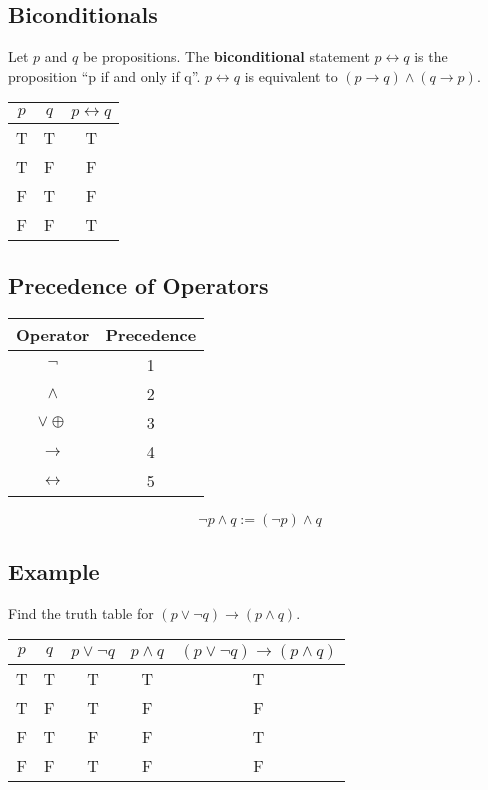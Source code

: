 \documentclass{math}
\begin{document}
\subsection*{Biconditionals}
Let \( p \) and \( q \) be propositions. The \textbf{biconditional} statement
\( p \leftrightarrow q \) is the proposition ``p if and only if q''.
\( p \leftrightarrow q \) is equivalent to \( (p \to q) \wedge (q \to p) \).
\begin{center}
  \begin{tabular}{|c|c|c|}
    \hline
    \( p \) & \( q \) & \( p \leftrightarrow q \) \\ \hline
    T & T & T \\ \hline
    T & F & F \\ \hline
    F & T & F \\ \hline
    F & F & T \\ \hline
  \end{tabular}
\end{center}

\subsection*{Precedence of Operators}
\begin{center}
  \begin{tabular}{|c|c|}
    \hline
    Operator              & Precedence \\ \hline
    \( \neg \)            & 1 \\ \hline
    \( \wedge \)          & 2 \\ \hline
    \( \vee \oplus \)     & 3 \\ \hline
    \( \to \)             & 4 \\ \hline
    \( \leftrightarrow \) & 5 \\ \hline
  \end{tabular}
\end{center}
\[ \neg{p} \wedge q := (\neg{p}) \wedge q \]

\subsection*{Example}
Find the truth table for \( (p \vee \neg{q}) \to (p \wedge q) \).
\begin{center}
  \begin{tabular}{|c|c|c|c|c|}
    \hline
    \( p \) & \( q \) & \( p \vee \neg{q} \) & \( p \wedge q \) &
    \( (p \vee \neg{q}) \to (p \wedge q) \) \\ \hline
    T & T & T & T & T \\ \hline
    T & F & T & F & F \\ \hline
    F & T & F & F & T \\ \hline
    F & F & T & F & F \\ \hline
  \end{tabular}
\end{center}
\end{document}
